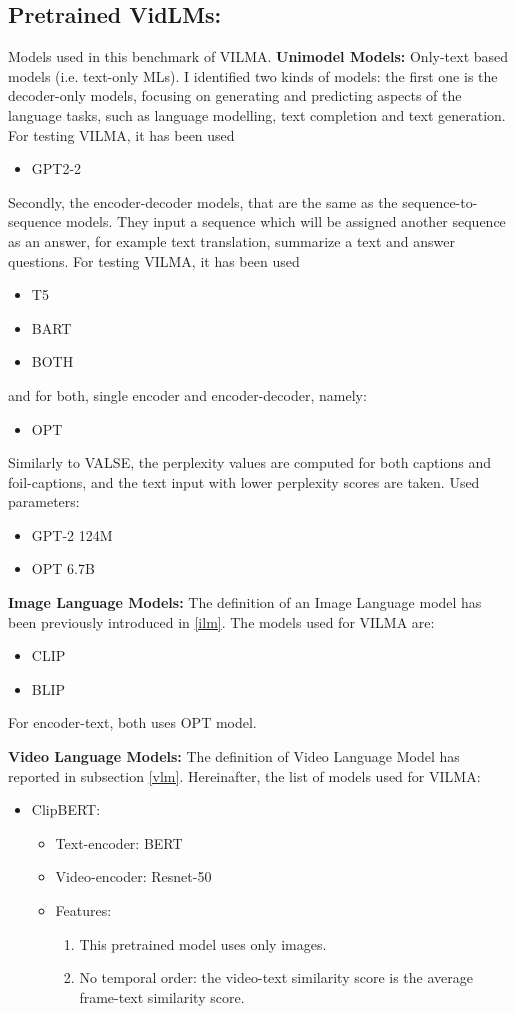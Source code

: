 \subsection{Pretrained VidLMs:}
Models used in this benchmark of VILMA.
\textbf{Unimodel Models:}
Only-text based models (i.e. text-only MLs).
I identified two kinds of models:
the first one is the decoder-only models, focusing on generating and predicting aspects of the language tasks, such as language modelling, text completion and text generation. For testing VILMA, it has been used
\begin{itemize}
\item GPT2-2
\end{itemize}
Secondly, the encoder-decoder models, that are the same as the
sequence-to-sequence models. They input a sequence which will be assigned another sequence as an answer, for example text translation, summarize a text and answer questions. For testing VILMA, it has been used
\begin{itemize}
\item T5
\item BART
\item BOTH
\end{itemize}
and for both, single encoder and encoder-decoder, namely:
\begin{itemize}
\item OPT
\end{itemize}

Similarly to VALSE, the perplexity values are computed for both captions and foil-captions, and the text input with lower perplexity scores are taken.
Used parameters:
\begin{itemize}
\item GPT-2 124M
\item OPT 6.7B
\end{itemize}


\textbf{Image Language Models:}
The definition of an Image Language model has been previously introduced in \ref{ilm}.
The models used for VILMA are:
\begin{itemize}
\item CLIP
\item BLIP
\end{itemize}
For encoder-text, both uses OPT model.
 
\textbf{Video Language Models:}
The definition of Video Language Model has reported in subsection \ref{vlm}.
Hereinafter, the list of models used for VILMA:
\begin{itemize}
\item ClipBERT:
\begin{itemize}
\item Text-encoder: BERT
\item Video-encoder: Resnet-50
\item Features:
\begin{enumerate}
\item This pretrained model uses only images.
\item No temporal order: the video-text similarity score is the average frame-text similarity score.
\end{enumerate}
\end{itemize}
\end{itemize}

